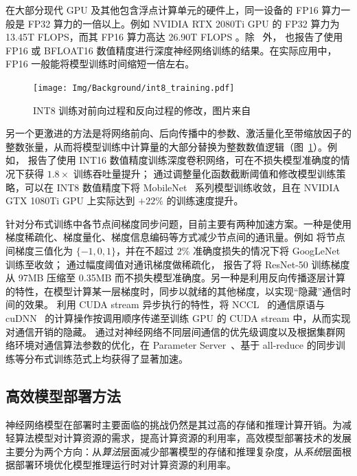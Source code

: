 在大部分现代 GPU 及其他包含浮点计算单元的硬件上，同一设备的 FP16 算力一般是 FP32 算力的一倍以上。例如 NVIDIA RTX 2080Ti GPU 的 FP32 算力为 13.45T FLOPS，而其 FP16 算力高达 26.90T FLOPS \citep{nvidia2018turing}。除~\citet{micikevicius2018mixed} 外，\citet{abadi2016tensorflow, dean2012large} 也报告了使用 FP16 或 BFLOAT16 数值精度进行深度神经网络训练的结果。在实际应用中，FP16 一般能将模型训练时间缩短一倍左右。

\begin{figure}[htb]
  \centering
  \texttt{[image: Img/Background/int8\_training.pdf]}
  \caption{INT8 训练对前向过程和反向过程的修改，图片来自~\citet{zhu2019towards}}
  \label{img::background::int8_training}
\end{figure}

另一个更激进的方法是将网络前向、后向传播中的参数、激活量化至带缩放因子的整数张量，从而将模型训练中计算量的大部分替换为整数数值逻辑（图~\ref{img::background::int8_training}）。例如，\citet{das2018mixed} 报告了使用 INT16 数值精度训练深度卷积网络，可在不损失模型准确度的情况下获得 $1.8\times$ 训练吞吐量提升；\citet{zhu2019towards} 通过调整量化函数截断阈值和修改模型训练策略，可以在 INT8 数值精度下将 MobileNet~\citep{howard2017mobilenets, Sandler_2018} 系列模型训练收敛，且在 NVIDIA GTX 1080Ti GPU 上实际达到 $+22\%$ 的训练速度提升。

针对分布式训练中各节点间梯度同步问题，目前主要有两种加速方案。一种是使用梯度稀疏化、梯度量化、梯度信息编码等方式减少节点间的通讯量。例如 \citet{wen2017terngrad} 将节点间梯度三值化为 $\{-1, 0, 1\}$，并在不超过 $2\%$ 准确度损失的情况下将 GoogLeNet~\citep{szegedy2015going} 训练至收敛；\citet{aji2017sparse, lin2018deep} 通过幅度阈值对通讯梯度做稀疏化，\citet{lin2018deep} 报告了将 ResNet-50 训练梯度从 97MB 压缩至 0.35MB 而不损失模型准确度。另一种是利用反向传播逐层计算的特性，在模型计算某一层梯度时，同步以就绪的其他梯度，以实现“隐藏”通信时间的效果。\citet{abadi2016tensorflow, paszke2019pytorch} 利用 CUDA stream 异步执行的特性，将 NCCL~\citep{jeaugey2017nccl} 的通信原语与 cuDNN~\citep{chetlur2014cudnn} 的计算操作按调用顺序传递至训练 GPU 的 CUDA stream 中，从而实现对通信开销的隐藏。\citet{peng2019generic} 通过对神经网络不同层间通信的优先级调度以及根据集群网络环境对通信算法参数的优化，在 Parameter Server~\citep{li2014scaling}、基于 all-reduce 的同步训练等分布式训练范式上均获得了显著加速。
\subsection{高效模型部署方法}
神经网络模型在部署时主要面临的挑战仍然是其过高的存储和推理计算开销。为减轻算法模型对计算资源的需求，提高计算资源的利用率，高效模型部署技术的发展主要分为两个方向：从\emph{算法}层面减少部署模型的存储和推理复杂度，从\emph{系统}层面根据部署环境优化模型推理运行时对计算资源的利用率。

